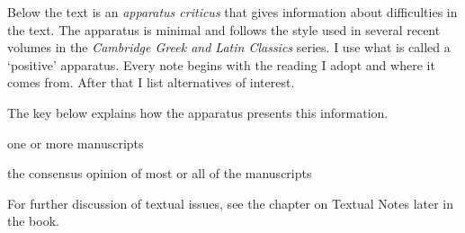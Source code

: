 Below the text is an \textit{apparatus criticus} that gives information about difficulties in the text.  The apparatus is minimal and follows the style used in several recent volumes in the \textit{Cambridge Greek and Latin Classics} series.  I use what is called a `positive' apparatus.  Every note begins with the reading I adopt and where it comes from.  After that I list alternatives of interest.  

The key below explains how the apparatus presents this information.

\begin{description}%
    [style=sameline,leftmargin=70pt,labelwidth=\widthof{\textbf{Name}}]
    \item[m] one or more manuscripts
    \item[M] the consensus opinion of most or all of the manuscripts
\end{description}

For further discussion of textual issues, see the chapter on Textual Notes later in the book.
